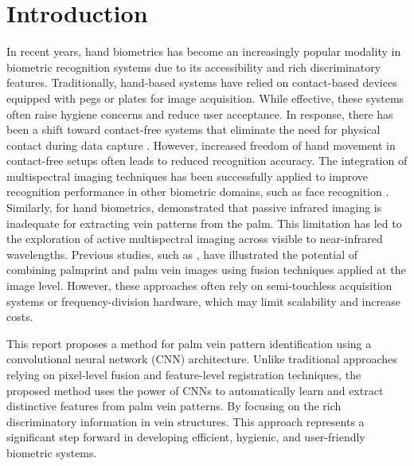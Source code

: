 \section{Introduction}

In recent years, hand biometrics has become an increasingly popular modality in biometric recognition systems due to its accessibility and rich discriminatory features. Traditionally, hand-based systems have relied on contact-based devices equipped with pegs or plates for image acquisition. While effective, these systems often raise hygiene concerns and reduce user acceptance. In response, there has been a shift toward contact-free systems that eliminate the need for physical contact during data capture \cite{xiong2005peg,jiang2007new,xiong2005model}. However, increased freedom of hand movement in contact-free setups often leads to reduced recognition accuracy. The integration of multispectral imaging techniques has been successfully applied to improve recognition performance in other biometric domains, such as face recognition \cite{kong2007multiscale, singh2008integrated}. Similarly, for hand biometrics, \cite{wang2006near} demonstrated that passive infrared imaging is inadequate for extracting vein patterns from the palm. This limitation has led to the exploration of active multispectral imaging across visible to near-infrared wavelengths. Previous studies, such as \cite{wang2007fusion}, have illustrated the potential of combining palmprint and palm vein images using fusion techniques applied at the image level. However, these approaches often rely on semi-touchless acquisition systems or frequency-division hardware, which may limit scalability and increase costs. 

This report proposes a method for palm vein pattern identification using a convolutional neural network (CNN) architecture. Unlike traditional approaches relying on pixel-level fusion and feature-level registration techniques, the proposed method uses the power of CNNs to automatically learn and extract distinctive features from palm vein patterns. By focusing on the rich discriminatory information in vein structures. This approach represents a significant step forward in developing efficient, hygienic, and user-friendly biometric systems.
